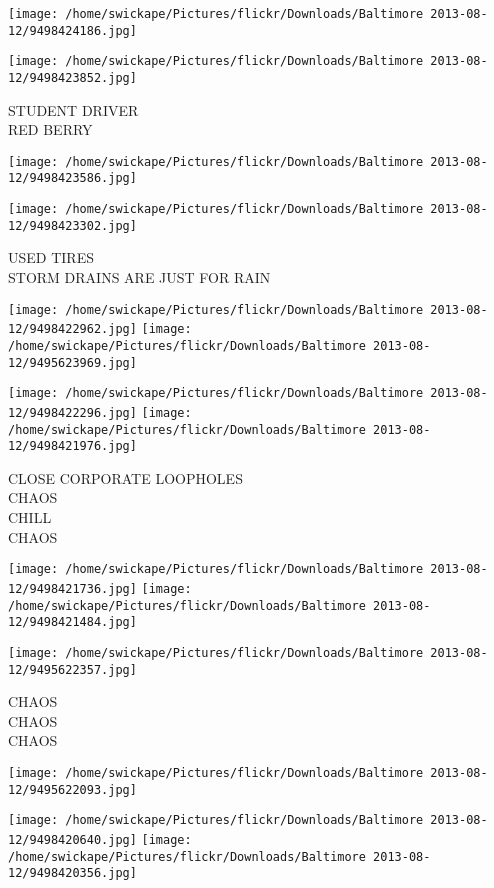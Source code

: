 \documentclass[10pt,letterpaper]{article}
\begin{document}
\texttt{[image: /home/swickape/Pictures/flickr/Downloads/Baltimore 2013-08-12/9498424186.jpg]}

\vspace{0.25in}
\texttt{[image: /home/swickape/Pictures/flickr/Downloads/Baltimore 2013-08-12/9498423852.jpg]}

STUDENT DRIVER\\
RED BERRY
\pagebreak

\texttt{[image: /home/swickape/Pictures/flickr/Downloads/Baltimore 2013-08-12/9498423586.jpg]}

\vspace{0.25in}
\texttt{[image: /home/swickape/Pictures/flickr/Downloads/Baltimore 2013-08-12/9498423302.jpg]}

USED TIRES\\
STORM DRAINS ARE JUST FOR RAIN
\pagebreak

\texttt{[image: /home/swickape/Pictures/flickr/Downloads/Baltimore 2013-08-12/9498422962.jpg]}
\texttt{[image: /home/swickape/Pictures/flickr/Downloads/Baltimore 2013-08-12/9495623969.jpg]}

\texttt{[image: /home/swickape/Pictures/flickr/Downloads/Baltimore 2013-08-12/9498422296.jpg]}
\texttt{[image: /home/swickape/Pictures/flickr/Downloads/Baltimore 2013-08-12/9498421976.jpg]}

CLOSE CORPORATE LOOPHOLES\\
CHAOS\\
CHILL\\
CHAOS
\pagebreak

\texttt{[image: /home/swickape/Pictures/flickr/Downloads/Baltimore 2013-08-12/9498421736.jpg]}
\texttt{[image: /home/swickape/Pictures/flickr/Downloads/Baltimore 2013-08-12/9498421484.jpg]}

\texttt{[image: /home/swickape/Pictures/flickr/Downloads/Baltimore 2013-08-12/9495622357.jpg]}

CHAOS\\
CHAOS\\
CHAOS
\pagebreak

\texttt{[image: /home/swickape/Pictures/flickr/Downloads/Baltimore 2013-08-12/9495622093.jpg]}

\vspace{0.25in}
\texttt{[image: /home/swickape/Pictures/flickr/Downloads/Baltimore 2013-08-12/9498420640.jpg]}
\texttt{[image: /home/swickape/Pictures/flickr/Downloads/Baltimore 2013-08-12/9498420356.jpg]}
\end{document}
